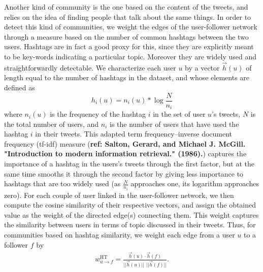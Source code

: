 Another kind of community is the one based on the content of the tweets, and relies on the idea of finding people that talk about the same things. In order to detect this kind of communities, we weight the edges of the user-follower network through a measure based on the number of common hashtags between the two users. Hashtags are in fact a good proxy for this, since they are explicitly meant to be key-words indicating a particular topic. Moreover they are widely used and straightforwardly detectable. We characterize each user $u$ by a vector $\vec{h}(u)$ of length equal to the number of hashtags in the dataset, and whose elements are defined as
\begin{equation}
h_i(u) = n_i(u) * \log{ \frac{N}{n_i} }
\end{equation}
where $n_i(u)$ is the frequency of the hashtag $i$ in the set of user $u$'s tweets, $N$ is the total number of users, and $n_i$ is the number of users that have used the hashtag $i$ in their tweets. This adapted term frequency--inverse document frequency (tf-idf) measure (\textbf{ref: Salton, Gerard, and Michael J. McGill. "Introduction to modern information retrieval." (1986).}) captures the importance of a hashtag in the users's tweets through the first factor, but at the same time smooths it through the second factor by giving less importance to hashtags that are too widely used (as $\frac{N}{n_i}$ approaches one, its logarithm approaches zero). For each couple of user linked in the user-follower network, we then compute the cosine similarity of their respective vectors, and assign the obtained value as the weight of the directed edge(s) connecting them. This weight captures the similarity between users in terms of topic discussed in their tweets. Thus, for communities based on hashtag similarity, we weight each edge from a user $u$ to a follower $f$ by 
\begin{align}
	w_{u \to f}^{\text{HT}} = \frac{\vec{h}(u) \cdot \vec{h}(f)}{||\vec{h}(u)|| \ \ ||\vec{h}(f)||}.
\end{align}